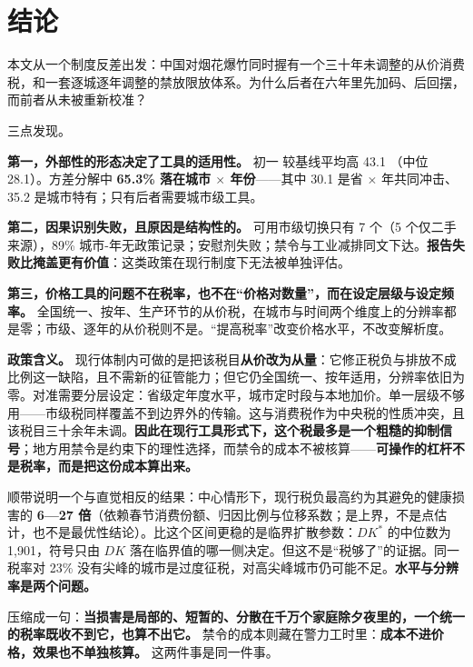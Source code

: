 \section{结论}

本文从一个制度反差出发：中国对烟花爆竹同时握有一个三十年未调整的从价消费税，和一套逐城逐年调整的禁放限放体系。为什么后者在六年里先加码、后回摆，而前者从未被重新校准？

三点发现。

\textbf{第一，外部性的形态决定了工具的适用性。} 初一  较基线平均高 43.1 \ugm（中位 28.1）。方差分解中 \textbf{65.3\% 落在城市 $\times$ 年份}——其中 30.1 是省 $\times$ 年共同冲击、35.2 是城市特有；只有后者需要城市级工具。

\textbf{第二，因果识别失败，且原因是结构性的。} 可用市级切换只有 7 个（5 个仅二手来源），89\% 城市-年无政策记录；安慰剂失败；禁令与工业减排同文下达。\textbf{报告失败比掩盖更有价值}：这类政策在现行制度下无法被单独评估。

\textbf{第三，价格工具的问题不在税率，也不在“价格对数量”，而在设定层级与设定频率。} 全国统一、按年、生产环节的从价税，在城市与时间两个维度上的分辨率都是零；市级、逐年的从价税则不是。“提高税率”改变价格水平，不改变解析度。

\textbf{政策含义。} 现行体制内可做的是把该税目\textbf{从价改为从量}：它修正税负与排放不成比例这一缺陷，且不需新的征管能力；但它仍全国统一、按年适用，分辨率依旧为零。对准需要分层设定：省级定年度水平，城市定时段与本地加价。单一层级不够用——市级税同样覆盖不到边界外的传输。这与消费税作为中央税的性质冲突，且该税目三十余年未调。\textbf{因此在现行工具形式下，这个税最多是一个粗糙的抑制信号}；地方用禁令是约束下的理性选择，而禁令的成本不被核算——\textbf{可操作的杠杆不是税率，而是把这份成本算出来。}

顺带说明一个与直觉相反的结果：中心情形下，现行税负最高约为其避免的健康损害的 \textbf{6—27 倍}（依赖春节消费份额、归因比例与位移系数；是上界，不是点估计，也不是最优性结论）。比这个区间更稳的是临界扩散参数：$DK^*$ 的中位数为 1{,}901，符号只由 $DK$ 落在临界值的哪一侧决定。但这不是“税够了”的证据。同一税率对 23\% 没有尖峰的城市是过度征税，对高尖峰城市仍可能不足。\textbf{水平与分辨率是两个问题。}

压缩成一句：\textbf{当损害是局部的、短暂的、分散在千万个家庭除夕夜里的，一个统一的税率既收不到它，也算不出它。} 禁令的成本则藏在警力工时里：\textbf{成本不进价格，效果也不单独核算。} 这两件事是同一件事。

